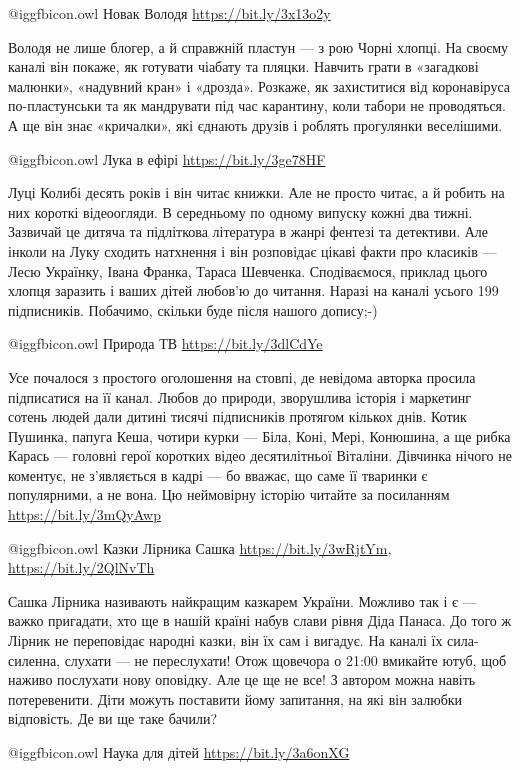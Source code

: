  @igg{fbicon.owl} Новак Володя \url{https://bit.ly/3x13o2y}

Володя не лише блогер, а й справжній пластун — з рою Чорні хлопці. На своєму каналі він покаже, як готувати чіабату та пляцки. Навчить грати в «загадкові малюнки», «надувний кран» і «дрозда». Розкаже, як захиститися від коронавіруса по-пластунськи та як мандрувати під час карантину, коли табори не проводяться. А ще він знає «кричалки», які єднають друзів і роблять прогулянки веселішими.

 @igg{fbicon.owl} Лука в ефірі \url{https://bit.ly/3ge78HF}

Луці Колибі десять років і він читає книжки. Але не просто читає, а й робить на них короткі відеоогляди. В середньому по одному випуску кожні два тижні. Зазвичай це дитяча та підліткова література в жанрі фентезі та детективи. Але інколи на Луку сходить натхнення і він розповідає цікаві факти про класиків — Лесю Українку, Івана Франка, Тараса Шевченка. Сподіваємося, приклад цього хлопця заразить і ваших дітей любов’ю до читання. Наразі на каналі усього 199 підписників. Побачимо, скільки буде після нашого допису;-)

 @igg{fbicon.owl} Природа ТВ \url{https://bit.ly/3dlCdYe}

Усе почалося з простого оголошення на стовпі, де невідома авторка просила підписатися на її канал. Любов до природи, зворушлива історія і маркетинг сотень людей дали дитині тисячі підписників протягом кількох днів. Котик Пушинка, папуга Кеша, чотири курки — Біла, Коні, Мері, Конюшина, а ще рибка Карась — головні герої коротких відео десятилітньої Віталіни. Дівчинка нічого не коментує, не з’являється в кадрі — бо вважає, що саме її тваринки є популярними, а не вона. Цю неймовірну історію читайте за посиланням \url{https://bit.ly/3mQyAwp}

 @igg{fbicon.owl} Казки Лірника Сашка \url{https://bit.ly/3wRjtYm}, \url{https://bit.ly/2QlNvTh}

Сашка Лірника називають найкращим казкарем України. Можливо так і є — важко
пригадати, хто ще в нашій країні набув слави рівня Діда Панаса. До того ж
Лірник не переповідає народні казки, він їх сам і вигадує. На каналі їх
сила-силенна, слухати  — не переслухати! Отож щовечора о 21:00 вмикайте ютуб,
щоб наживо послухати нову оповідку. Але це ще не все! З автором можна навіть
потеревенити. Діти можуть поставити йому запитання, на які він залюбки
відповість. Де ви ще таке бачили?

 @igg{fbicon.owl} Наука для дітей \url{https://bit.ly/3a6onXG}

